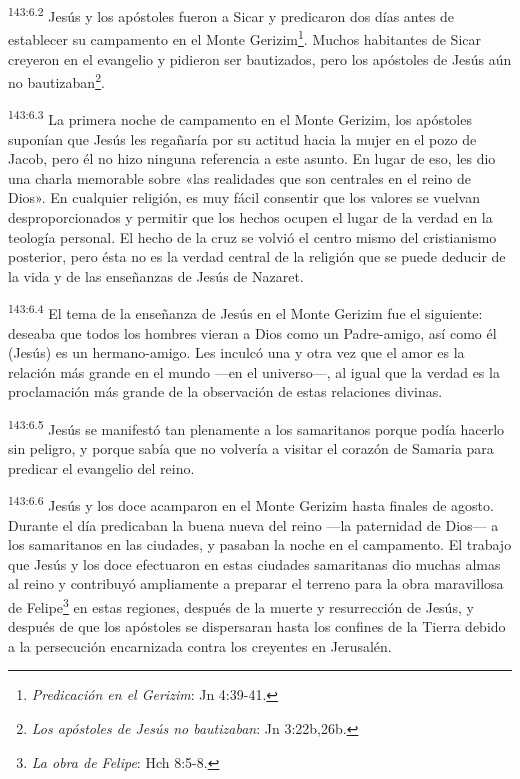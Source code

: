 \par 
\textsuperscript{143:6.2} Jesús y los apóstoles fueron a Sicar y predicaron dos días antes de establecer su campamento en el Monte Gerizim\footnote{\textit{Predicación en el Gerizim}: Jn 4:39-41.}. Muchos habitantes de Sicar creyeron en el evangelio y pidieron ser bautizados, pero los apóstoles de Jesús aún no bautizaban\footnote{\textit{Los apóstoles de Jesús no bautizaban}: Jn 3:22b,26b.}.

\par 
\textsuperscript{143:6.3} La primera noche de campamento en el Monte Gerizim, los apóstoles suponían que Jesús les regañaría por su actitud hacia la mujer en el pozo de Jacob, pero él no hizo ninguna referencia a este asunto. En lugar de eso, les dio una charla memorable sobre «las realidades que son centrales en el reino de Dios». En cualquier religión, es muy fácil consentir que los valores se vuelvan desproporcionados y permitir que los hechos ocupen el lugar de la verdad en la teología personal. El hecho de la cruz se volvió el centro mismo del cristianismo posterior, pero ésta no es la verdad central de la religión que se puede deducir de la vida y de las enseñanzas de Jesús de Nazaret.

\par 
\textsuperscript{143:6.4} El tema de la enseñanza de Jesús en el Monte Gerizim fue el siguiente: deseaba que todos los hombres vieran a Dios como un Padre-amigo, así como él (Jesús) es un hermano-amigo. Les inculcó una y otra vez que el amor es la relación más grande en el mundo ---en el universo---, al igual que la verdad es la proclamación más grande de la observación de estas relaciones divinas.

\par 
\textsuperscript{143:6.5} Jesús se manifestó tan plenamente a los samaritanos porque podía hacerlo sin peligro, y porque sabía que no volvería a visitar el corazón de Samaria para predicar el evangelio del reino.

\par 
\textsuperscript{143:6.6} Jesús y los doce acamparon en el Monte Gerizim hasta finales de agosto. Durante el día predicaban la buena nueva del reino ---la paternidad de Dios--- a los samaritanos en las ciudades, y pasaban la noche en el campamento. El trabajo que Jesús y los doce efectuaron en estas ciudades samaritanas dio muchas almas al reino y contribuyó ampliamente a preparar el terreno para la obra maravillosa de Felipe\footnote{\textit{La obra de Felipe}: Hch 8:5-8.} en estas regiones, después de la muerte y resurrección de Jesús, y después de que los apóstoles se dispersaran hasta los confines de la Tierra debido a la persecución encarnizada contra los creyentes en Jerusalén.

